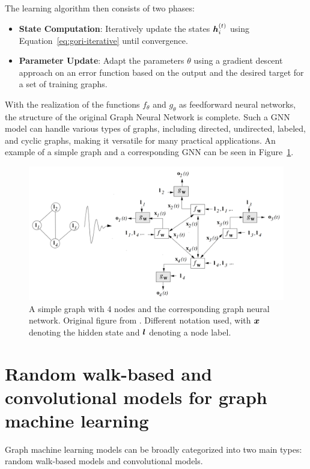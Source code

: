 The learning algorithm then consists of two phases:
\begin{itemize}
	\item \textbf{State Computation}: Iteratively update the states \( \bm{h}_i^{(t)} \) using Equation~\ref{eq:gori-iterative} until convergence.
	\item \textbf{Parameter Update}: Adapt the parameters \( \theta \) using a gradient descent approach on an error function based on the output and the desired target for a set of training graphs.
\end{itemize}
With the realization of the functions \( f_\theta \) and \( g_\theta \) as feedforward neural networks, the structure of the original Graph Neural Network is complete. Such a GNN model can handle various types of graphs, including directed, undirected, labeled, and cyclic graphs, making it versatile for many practical applications. An example of a simple graph and a corresponding GNN can be seen in Figure~\ref{fig:gori}.

\begin{figure}
	\includegraphics[width=\linewidth]{images/GNN-gori.png}
	\caption{A simple graph with 4 nodes and the corresponding graph neural network. Original figure from \cite{gori_new_2005}. Different notation used, with \( \bm{x} \) denoting the hidden state and \( \bm{l} \) denoting a node label.}
	\label{fig:gori}
\end{figure}

\section{Random walk-based and convolutional models for graph machine learning}

Graph machine learning models can be broadly categorized into two main types: random walk-based models and convolutional models.

